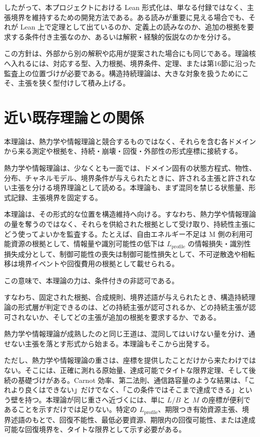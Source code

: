 \documentclass[12pt,a4paper]{article}
\begin{document}
したがって、本プロジェクトにおける Lean 形式化は、単なる付録ではなく、主張境界を維持するための開発方法である。ある読みが重要に見える場合でも、それが Lean 上で定理として出ているのか、定義上の読みなのか、追加の根拠を要求する条件付き主張なのか、あるいは解釈・経験的仮説なのかを分ける。

この方針は、外部から別の解釈や応用が提案された場合にも同じである。理論核へ入れるには、対応する型、入力根拠、境界条件、定理、または第16節に沿った監査上の位置づけが必要である。構造持続理論は、大きな対象を扱うためにこそ、主張を狭く型付けして積み上げる。

\section{近い既存理論との関係}\label{ux8fd1ux3044ux65e2ux5b58ux7406ux8ad6ux3068ux306eux95a2ux4fc2}

本理論は、熱力学や情報理論と競合するものではなく、それらを含む各ドメインから来る測定や根拠を、持続・崩壊・回復・外部性の形式座標に接続する。

熱力学や情報理論は、少なくとも一面では、ドメイン固有の状態方程式、物性、分布、チャネルモデル、境界条件が与えられたときに、許される主張と許されない主張を分ける境界理論として読める。本理論も、まず混同を禁じる状態量、形式記録、主張境界を固定する。

本理論は、その形式的な位置を構造維持へ向ける。すなわち、熱力学や情報理論の量を奪うのではなく、それらを供給された根拠として受け取り、持続性主張にどう使ってよいかを監査する。たとえば、自由エネルギー不足は M 側の利用可能資源の根拠として、情報量や識別可能性の低下は \(L_{\mathrm{profile}}\) の情報損失・識別性損失成分として、制御可能性の喪失は制御可能性損失として、不可逆散逸や相転移は境界イベントや回復費用の根拠として載せられる。

この意味で、本理論の力は、条件付きの非認可である。

すなわち、固定された根拠、合成規則、境界述語が与えられたとき、構造持続理論の形式層が判定できるのは、どの持続主張が認可されるか、どの持続主張が認可されないか、そしてどの主張が追加の根拠を要求するか、である。

熱力学や情報理論が成熟したのと同じ王道は、混同してはいけない量を分け、通せない主張を落とす形式から始まる。本理論もそこから出発する。

ただし、熱力学や情報理論の重さは、座標を提供したことだけから来たわけではない。そこには、正確に測れる原始量、達成可能でタイトな限界定理、そして後続の基礎づけがある。Carnot 効率、第二法則、通信路容量のような結果は、「これより良くはできない」だけでなく、「この条件ではそこまで達成できる」という壁を持つ。本理論が同じ重さへ近づくには、単に \(L/B\) と \(M\) の座標が便利であることを示すだけでは足りない。特定の \(L_{\mathrm{profile}}\)、期限つき有効資源主張、境界述語のもとで、回復不能性、最低必要資源、期限内の回復可能性、または達成可能な回復境界を、タイトな限界として示す必要がある。
\end{document}
